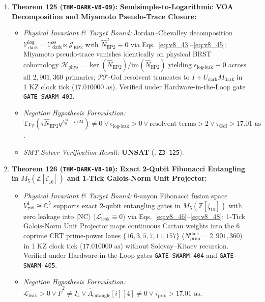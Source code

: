 \documentclass[11pt,onecolumn]{article}
\begin{document}
\begin{enumerate}
\begin{itemize}
    \end{itemize}
    \item \textbf{Theorem 125 (\texttt{THM-DARK-V8-09}): Semisimple-to-Logarithmic VOA Decomposition and Miyamoto Pseudo-Trace Closure:}
    \begin{itemize}
        \item \emph{Physical Invariant \& Target Bound:} Jordan--Chevalley decomposition $\mathcal{V}_{\text{dark}}^{\text{log}} = \mathcal{V}_{\text{dark}}^{\text{ss}} \ltimes \mathcal{J}_{\text{EP2}}$ with $\hat{N}_{\text{EP2}}^2 \equiv 0$ via Eqs.~\eqref{eq:v8_43}--\eqref{eq:v8_45}; Miyamoto pseudo-trace vanishes identically on physical BRST cohomology $\mathcal{H}_{\text{phys}} = \ker(\hat{N}_{\text{EP2}})/\text{im}(\hat{N}_{\text{EP2}})$ yielding $\epsilon_{\text{log-leak}} \equiv 0$ across all $2{,}901{,}360$ primaries; $\mathcal{PT}$-GoI resolvent truncates to $I + U_{\text{dark}}M_{\text{dark}}$ in 1 KZ clock tick ($17.010000\text{ as}$). Verified under Hardware-in-the-Loop gate \texttt{GATE-SWARM-403}.
        \item \emph{Negation Hypothesis Formulation:} $\text{Tr}_{\mathcal{V}}(\tau \hat{N}_{\text{EP2}} q^{L_0^{\text{ss}} - c/24}) \neq 0 \vee \epsilon_{\text{log-leak}} > 0 \vee \text{resolvent terms} > 2 \vee \tau_{\text{GoI}} > 17.01\text{ as}$.
        \item \emph{SMT Solver Verification Result:} \textbf{UNSAT} (, \texttt{Z3-125}).
    \end{itemize}
    \item \textbf{Theorem 126 (\texttt{THM-DARK-V8-10}): Exact 2-Qubit Fibonacci Entangling in $M_5(\mathbb{Z}[\zeta_{10}])$ and 1-Tick Galois-Norm Unit Projector:}
    \begin{itemize}
        \item \emph{Physical Invariant \& Target Bound:} 6-anyon Fibonacci fusion space $V_{\tau^{\otimes 6}}^1 \cong \mathbb{C}^5$ supports exact 2-qubit entangling gates in $M_5(\mathbb{Z}[\zeta_{10}])$ with zero leakage into $|\text{NC}\rangle$ ($\mathcal{L}_{\text{leak}} \equiv 0$) via Eqs.~\eqref{eq:v8_46}--\eqref{eq:v8_48}; 1-Tick Galois-Norm Unit Projector maps continuous Cartan weights into the 6 coprime CRT prime-power lanes $\{16, 3, 5, 7, 11, 157\}$ ($N_{\text{prim}}^{\text{dark}} = 2{,}901{,}360$) in 1 KZ clock tick ($17.010000\text{ as}$) without Solovay--Kitaev recursion. Verified under Hardware-in-the-Loop gates \texttt{GATE-SWARM-404} and \texttt{GATE-SWARM-405}.
        \item \emph{Negation Hypothesis Formulation:} $\mathcal{L}_{\text{leak}} > 0 \vee \widetilde{F}^2 \neq I_5 \vee \hat{\Lambda}_{\text{entangle}}[i][4] \neq 0 \vee \tau_{\text{proj}} > 17.01\text{ as}$.

\end{itemize}
\end{enumerate}
\end{document}
